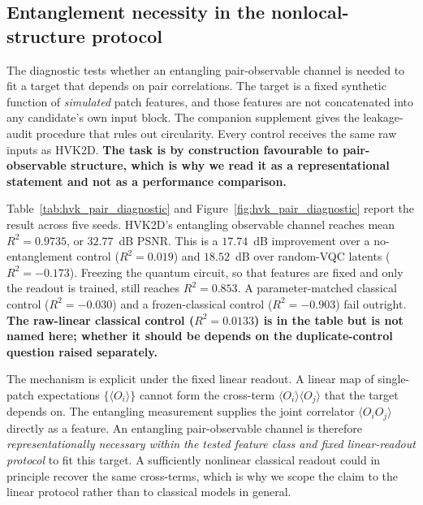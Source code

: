 \documentclass[pdflatex,sn-basic]{sn-jnl}
\begin{document}
\subsection{Entanglement necessity in the nonlocal-structure protocol}
\label{sec:entanglement_necessity}

The diagnostic tests whether an entangling pair-observable channel is needed to
fit a target that depends on pair correlations. The target is a fixed synthetic
function of \emph{simulated} patch features, and those features are not
concatenated into any candidate's own input block. The companion supplement
gives the leakage-audit procedure that rules out circularity. Every control
receives the same raw inputs as HVK2D. {\color{red}\textbf{The task is by
construction favourable to pair-observable structure, which is why we read it as
a representational statement and not as a performance comparison.}}

Table~\ref{tab:hvk_pair_diagnostic} and Figure~\ref{fig:hvk_pair_diagnostic}
report the result across five seeds. HVK2D's entangling observable channel
reaches mean $R^2=0.9735$, or $32.77$~dB PSNR. This is a $17.74$~dB improvement
over a no-entanglement control ($R^2=0.019$) and $18.52$~dB over random-VQC
latents ($R^2=-0.173$). Freezing the quantum circuit, so that features are fixed
and only the readout is trained, still reaches $R^2=0.853$. A parameter-matched
classical control ($R^2=-0.030$) and a frozen-classical control ($R^2=-0.903$)
fail outright. {\color{red}\textbf{The raw-linear classical control
($R^2=0.0133$) is in the table but is not named here; whether it should be
depends on the duplicate-control question raised separately.}}

The mechanism is explicit under the fixed linear readout. A linear map of
single-patch expectations $\{\langle O_i\rangle\}$ cannot form the cross-term
$\langle O_i\rangle\langle O_j\rangle$ that the target depends on. The entangling
measurement supplies the joint correlator $\langle O_iO_j\rangle$ directly as a
feature. An entangling pair-observable channel is therefore
\emph{representationally necessary within the tested feature class and fixed
linear-readout protocol} to fit this target. A sufficiently nonlinear classical
readout could in principle recover the same cross-terms, which is why we scope
the claim to the linear protocol rather than to classical models in general.
\end{document}

